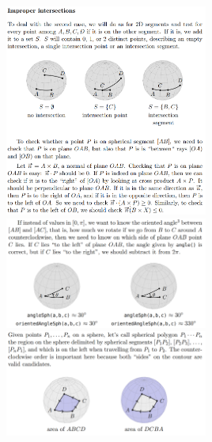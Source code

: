 \documentclass[8pt, a4paper, oneside, twocolumn]{extarticle}
\begin{document}
\\\includegraphics[width=0.5\textwidth,height=0.5\textheight,keepaspectratio]{segsegcir3}
\\\includegraphics[width=0.5\textwidth,height=0.5\textheight,keepaspectratio]{orientedangle}
\\\includegraphics[width=0.5\textwidth,height=0.5\textheight,keepaspectratio]{spherearea}
\end{document}
